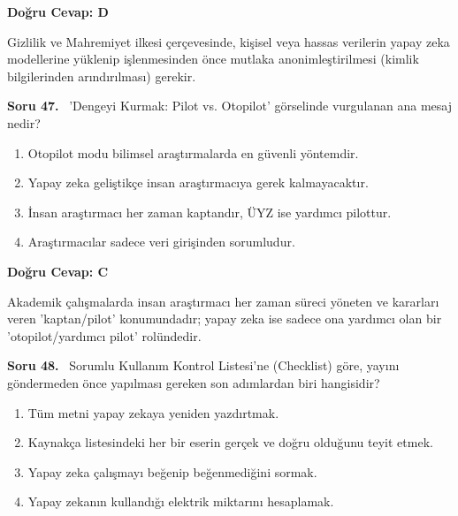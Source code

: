 \documentclass[11pt,a4paper,openany]{book}
\begin{document}
\vspace{4pt}
\begin{tcolorbox}[title=Cevap ve Açıklama, colback=gray!3!white, colframe=primarycolor!90!black, arc=2mm, fonttitle=\bfseries\sffamily, top=6pt, bottom=6pt]
    \textbf{Doğru Cevap: D}

    \vspace{2pt}
    Gizlilik ve Mahremiyet ilkesi çerçevesinde, kişisel veya hassas verilerin yapay zeka modellerine yüklenip işlenmesinden önce mutlaka anonimleştirilmesi (kimlik bilgilerinden arındırılması) gerekir.
\end{tcolorbox}
\vspace{10pt}
\needspace{5cm}
\vspace{8pt}
\noindent\textbf{\large\sffamily Soru 47.} \ 'Dengeyi Kurmak: Pilot vs. Otopilot' görselinde vurgulanan ana mesaj nedir?

\begin{enumerate}[label=\Alph*), leftmargin=25pt, topsep=4pt, itemsep=2pt]
        \item Otopilot modu bilimsel araştırmalarda en güvenli yöntemdir.
        \item Yapay zeka geliştikçe insan araştırmacıya gerek kalmayacaktır.
        \item İnsan araştırmacı her zaman kaptandır, ÜYZ ise yardımcı pilottur.
        \item Araştırmacılar sadece veri girişinden sorumludur.
\end{enumerate}

\vspace{4pt}
\begin{tcolorbox}[title=Cevap ve Açıklama, colback=gray!3!white, colframe=primarycolor!90!black, arc=2mm, fonttitle=\bfseries\sffamily, top=6pt, bottom=6pt]
    \textbf{Doğru Cevap: C}

    \vspace{2pt}
    Akademik çalışmalarda insan araştırmacı her zaman süreci yöneten ve kararları veren 'kaptan/pilot' konumundadır; yapay zeka ise sadece ona yardımcı olan bir 'otopilot/yardımcı pilot' rolündedir.
\end{tcolorbox}
\vspace{10pt}
\needspace{5cm}
\vspace{8pt}
\noindent\textbf{\large\sffamily Soru 48.} \ Sorumlu Kullanım Kontrol Listesi'ne (Checklist) göre, yayını göndermeden önce yapılması gereken son adımlardan biri hangisidir?

\begin{enumerate}[label=\Alph*), leftmargin=25pt, topsep=4pt, itemsep=2pt]
        \item Tüm metni yapay zekaya yeniden yazdırtmak.
        \item Kaynakça listesindeki her bir eserin gerçek ve doğru olduğunu teyit etmek.
        \item Yapay zeka çalışmayı beğenip beğenmediğini sormak.
        \item Yapay zekanın kullandığı elektrik miktarını hesaplamak.
\end{enumerate}
\end{document}
